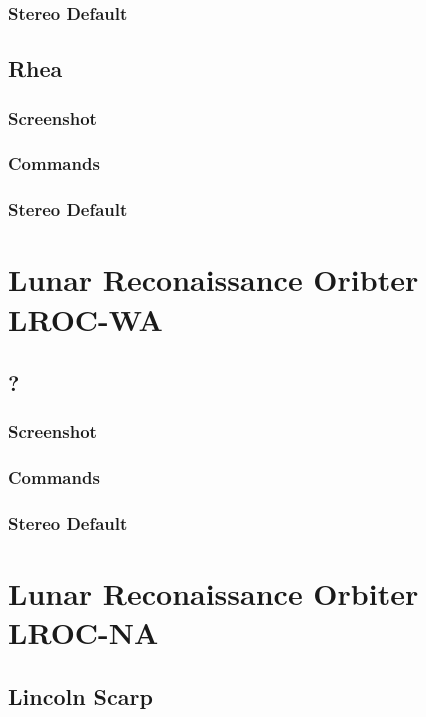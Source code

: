 \subsubsection*{Stereo Default}

\subsection{Rhea}

\subsubsection*{Screenshot}

\subsubsection*{Commands}

\subsubsection*{Stereo Default}

\section{Lunar Reconaissance Oribter LROC-WA}

\subsection{?}

\subsubsection*{Screenshot}

\subsubsection*{Commands}

\subsubsection*{Stereo Default}

\section{Lunar Reconaissance Orbiter LROC-NA}

\subsection{Lincoln Scarp}

